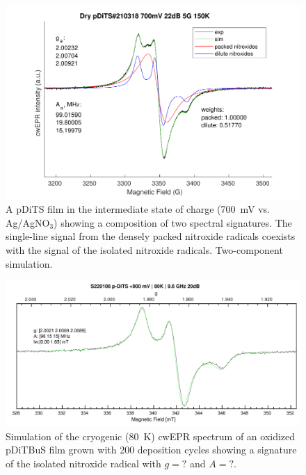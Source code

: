 \begin{figure}[h]
\center
	\includegraphics[width=1\textwidth]{./operando_epr/figures/CRYO/cw_sim_pDiTS_210318_700mV_2comp.pdf}
	\caption{A pDiTS film in the intermediate state of charge (700~mV vs. Ag/AgNO$_3$) showing a composition of two spectral signatures. The single-line signal from the densely packed nitroxide radicals coexists with the signal of the isolated nitroxide radicals. Two-component simulation.}
	\label{fig:cwEPR_CRYO_DiTS_2_COMP_SIM}
\end{figure}



\begin{figure}[h]
\center
	\includegraphics[width=1\textwidth]{./operando_epr/figures/CRYO/S220106_p-DiTS_OX_80K_CW_SIM.pdf}
	\caption{Simulation of the cryogenic (80~K) cwEPR spectrum of an oxidized pDiTBuS film grown with 200 deposition cycles showing a signature of the isolated nitroxide radical with $g=?$ and $A=?$.}
	\label{fig:cwEPR_CRYO_DiTBuS_CHG_SIM}
\end{figure}



